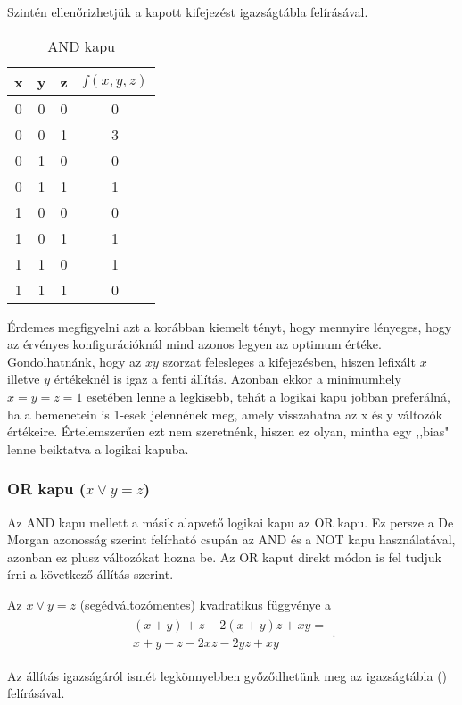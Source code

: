 Szintén ellenőrizhetjük a kapott kifejezést igazságtábla felírásával. 
\begin{table}[ht]
	\footnotesize
	\centering
	\begin{tabular}{ c c c c }
		\toprule
		x & y & z & $f(x,y,z)$ \\
		\midrule
		0 & 0 & 0 & 0 \\
		0 & 0 & 1 & 3 \\
		0 & 1 & 0 & 0 \\
		0 & 1 & 1 & 1 \\
		1 & 0 & 0 & 0 \\
		1 & 0 & 1 & 1 \\
		1 & 1 & 0 & 1 \\
		1 & 1 & 1 & 0 \\		
		\bottomrule
	\end{tabular}
	\caption{AND kapu}
	\label{tab:ANDgate}
\end{table}


Érdemes megfigyelni azt a korábban kiemelt tényt, hogy mennyire lényeges, hogy az érvényes konfigurációknál mind azonos legyen az optimum értéke. Gondolhatnánk, hogy az $xy$ szorzat felesleges a kifejezésben, hiszen lefixált $x$ illetve $y$ értékeknél is igaz a fenti állítás. Azonban ekkor a minimumhely $x=y=z=1$ esetében lenne a legkisebb, tehát a logikai kapu jobban preferálná, ha a bemenetein is 1-esek jelennének meg, amely visszahatna az x és y változók értékeire. Értelemszerűen ezt nem szeretnénk, hiszen ez olyan, mintha egy ,,bias" lenne beiktatva a logikai kapuba.


\subsubsection{OR kapu ($x \vee y = z$)}

Az AND kapu mellett a másik alapvető logikai kapu az OR kapu. Ez persze a De Morgan azonosság szerint felírható csupán az AND és a NOT kapu használatával, azonban ez plusz változókat hozna be. Az OR kaput direkt módon is fel tudjuk írni a következő állítás szerint. 

\begin{allitas}
	Az $x \vee y = z$ (segédváltozómentes) kvadratikus függvénye a 
	\begin{align}
		\begin{split}
			(x+y)+z-2(x+y)z+xy = \\
			x+y+z-2xz-2yz+xy
		\end{split}.
	\end{align}

	Az állítás igazságáról ismét legkönnyebben győződhetünk meg az igazságtábla () felírásával.
\end{allitas}

